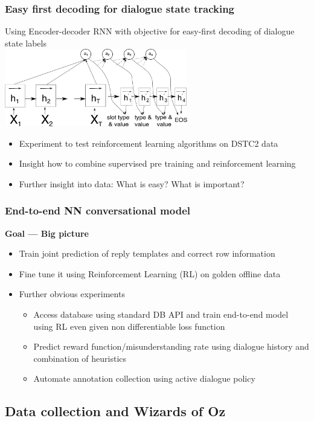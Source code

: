 \documentclass[10pt, compress,british,xcolor={svgnames,dvipsnames,x11names},trans]{beamer}
\begin{document}
\begin{frame}\frametitle{Easy first decoding for dialogue state tracking}
    Using Encoder-decoder RNN with objective for easy-first decoding of dialogue state labels  \\
    \includegraphics[width=0.6\textwidth]{encdec_easy}
    \begin{itemize}
        \item Experiment to test reinforcement learning algorithms on DSTC2 data
        \item Insight how to combine supervised pre training and reinforcement learning
        \item Further insight into data: What is easy? What is important?
    \end{itemize}
\end{frame}

\begin{frame}\frametitle{End-to-end NN conversational model}
    {\bf Goal --- Big picture}
    \begin{itemize}
        \item Train joint prediction of reply templates and correct row information 
        \item Fine tune it using Reinforcement Learning (RL) on golden offline data
        \item Further obvious experiments
        \begin{itemize}
            \item Access database using standard DB API and train end-to-end model using RL even given non differentiable loss function
            \item Predict reward function/misunderstanding rate using dialogue history and combination of heuristics
            \item Automate annotation collection using active dialogue policy
        \end{itemize}
    \end{itemize}
\end{frame}

\subsection{Data collection and Wizards of Oz}
\end{document}
